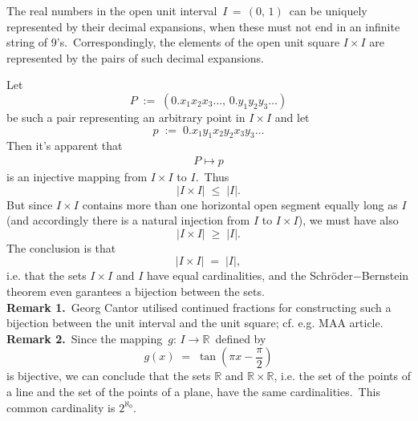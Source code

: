\documentclass[12pt]{article}
\theoremstyle{definition}
\begin{document}
The real numbers in the open unit interval\, $I \,=\,(0,\,1)$\, can be uniquely represented by their decimal expansions, when these must not end in an infinite string of 9's.\, Correspondingly, the elements of the open unit square $I\!\times\!I$ are represented by the pairs of such decimal expansions.

Let 
$$P \;:=\; (0.x_1x_2x_3\ldots,\,0.y_1y_2y_3\ldots)$$ 
be such a pair representing an arbitrary point in $I\!\times\!I$ and let\, 
$$p \;:=\; 0.x_1y_1x_2y_2x_3y_3\ldots$$ 
Then it's apparent that
\begin{align}
P \mapsto p
\end{align}
is an injective mapping from $I\!\times\!I$ to $I$.\, Thus
$$|I\!\times\!I| \;\le\; |I|.$$
But since $I\!\times\!I$ contains more than one horizontal open segment equally long as $I$ (and accordingly there is a natural injection from $I$ to $I\!\times\!I$), we must have also
$$|I\!\times\!I| \;\ge\; |I|.$$
The conclusion is that
$$|I\!\times\!I| \;=\; |I|,$$
i.e. that the sets $I\!\times\!I$ and $I$ have equal cardinalities, 
and the Schr\"oder$-$Bernstein theorem even garantees a bijection between the sets.\\


\textbf{Remark 1.}\, Georg Cantor utilised continued fractions for constructing such a bijection between the unit interval and the unit square; cf. e.g.  MAA article.\\

\textbf{Remark 2.}\, Since the mapping\, $g\!:\,I \to \mathbb{R}$\, defined by
$$g(x) \;=\; \tan\left(\pi{x}-\frac{\pi}{2}\right)$$
is bijective, we can conclude that the sets $\mathbb{R}$ and $\mathbb{R}\!\times\!\mathbb{R}$, i.e. the set of the points of a line and the set of the points of a plane, have the same cardinalities.\, This common cardinality is $2^{\aleph_0}$.



\end{document}
